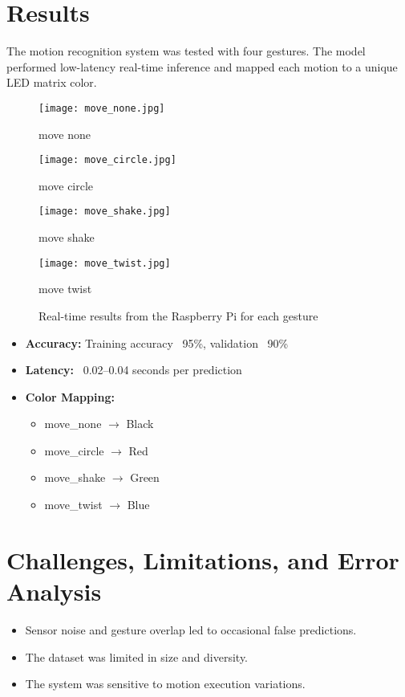 \documentclass[a4paper,12pt]{article}
\begin{document}
\section{Results}
The motion recognition system was tested with four gestures. The model performed low-latency real-time inference and mapped each motion to a unique LED matrix color.

\begin{figure}[htbp]
  \centering
  \begin{minipage}{0.45\textwidth}
    \centering
    \texttt{[image: move\_none.jpg]}
    \caption*{move none}
  \end{minipage}
  \hfill
  \begin{minipage}{0.45\textwidth}
    \centering
    \texttt{[image: move\_circle.jpg]}
    \caption*{move circle}
  \end{minipage}
  \vspace{0.5cm}
  \begin{minipage}{0.45\textwidth}
    \centering
    \texttt{[image: move\_shake.jpg]}
    \caption*{move shake}
  \end{minipage}
  \hfill
  \begin{minipage}{0.45\textwidth}
    \centering
    \texttt{[image: move\_twist.jpg]}
    \caption*{move twist}
  \end{minipage}
  \caption{Real-time results from the Raspberry Pi for each gesture}
  \label{fig:raspberrypi_images}
\end{figure}

\begin{itemize}
    \item \textbf{Accuracy:} Training accuracy ~95\%, validation ~90\%
    \item \textbf{Latency:} ~0.02--0.04 seconds per prediction
    \item \textbf{Color Mapping:}
    \begin{itemize}
        \item move\_none $\rightarrow$ Black
        \item move\_circle $\rightarrow$ Red
        \item move\_shake $\rightarrow$ Green
        \item move\_twist $\rightarrow$ Blue
    \end{itemize}
\end{itemize}

\section{Challenges, Limitations, and Error Analysis}
\begin{itemize}
    \item Sensor noise and gesture overlap led to occasional false predictions.
    \item The dataset was limited in size and diversity.
    \item The system was sensitive to motion execution variations.
\end{itemize}
\end{document}
